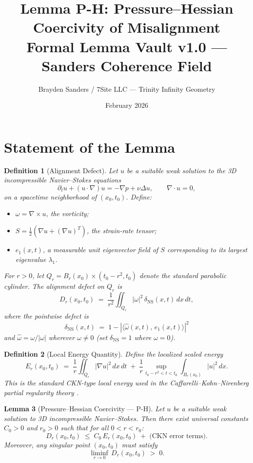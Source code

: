 \documentclass[11pt]{article}
\title{%
  Lemma P-H: Pressure--Hessian Coercivity of Misalignment\\[4pt]
  \large Formal Lemma Vault v1.0 --- Sanders Coherence Field}
\author{Brayden Sanders / 7Site LLC --- Trinity Infinity Geometry}
\date{February 2026}
\newtheorem{lemma}{Lemma}
\newtheorem{definition}[lemma]{Definition}
\theoremstyle{definition}
\begin{document}
\maketitle

\section{Statement of the Lemma}

\begin{definition}[Alignment Defect]
\label{def:alignment-defect}
Let $u$ be a suitable weak solution to the 3D incompressible Navier--Stokes equations
\[
  \partial_t u + (u \cdot \nabla) u = -\nabla p + \nu \Delta u, \qquad \nabla \cdot u = 0,
\]
on a spacetime neighborhood of $(x_0, t_0)$.  Define:
\begin{itemize}
  \item $\omega = \nabla \times u$, the vorticity;
  \item $S = \tfrac{1}{2}(\nabla u + (\nabla u)^T)$, the strain-rate tensor;
  \item $e_1(x,t)$, a measurable unit eigenvector field of $S$ corresponding to its largest eigenvalue $\lambda_1$.
\end{itemize}
For $r > 0$, let $Q_r = B_r(x_0) \times (t_0 - r^2, t_0)$ denote the standard parabolic cylinder.  The \emph{alignment defect} on $Q_r$ is
\[
  D_r(x_0, t_0) \;=\; \frac{1}{r^2} \iint_{Q_r} |\omega|^2 \,\delta_{\mathrm{NS}}(x,t)\, dx\, dt,
\]
where the pointwise defect is
\[
  \delta_{\mathrm{NS}}(x,t) \;=\; 1 - |\langle \hat{\omega}(x,t),\, e_1(x,t) \rangle|^2
\]
and $\hat{\omega} = \omega / |\omega|$ wherever $\omega \neq 0$ (set $\delta_{\mathrm{NS}} = 1$ where $\omega = 0$).
\end{definition}

\begin{definition}[Local Energy Quantity]
\label{def:local-energy}
Define the localized scaled energy
\[
  E_r(x_0, t_0) \;=\; \frac{1}{r} \iint_{Q_r} |\nabla u|^2\, dx\, dt
  \;+\; \frac{1}{r} \sup_{t_0 - r^2 < t < t_0} \int_{B_r(x_0)} |u|^2\, dx.
\]
This is the standard CKN-type local energy used in the Caffarelli--Kohn--Nirenberg partial regularity theory \cite{CKN}.
\end{definition}

\begin{lemma}[Pressure--Hessian Coercivity --- P-H]
\label{lem:PH}
Let $u$ be a suitable weak solution to 3D incompressible Navier--Stokes.
Then there exist universal constants $C_0 > 0$ and $r_0 > 0$ such that for all $0 < r < r_0$:
\[
  D_r(x_0, t_0) \;\leq\; C_0 \, E_r(x_0, t_0) \;+\; \text{(CKN error terms)}.
\]
Moreover, any singular point $(x_0, t_0)$ must satisfy
\[
  \liminf_{r \to 0}\, D_r(x_0, t_0) \;>\; 0.
\]
\end{lemma}
\end{document}
